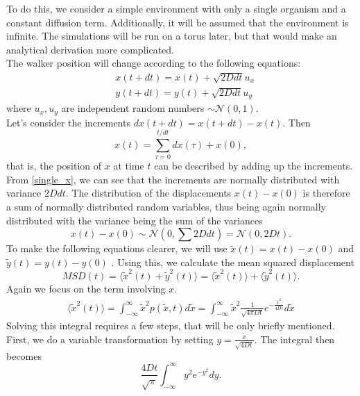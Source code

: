 \documentclass{article}
\begin{document}
To do this, we consider a simple environment with only a single organism and a constant diffusion term. 
Additionally, it will be assumed that the environment is infinite. 
The simulations will be run on a torus later, but that would make an analytical derivation more complicated.\\
The walker position will change according to the following equations:
\begin{align}
    & x(t + dt) = x(t) + \sqrt{2D dt} u_x \label{single_x}\\
    & y(t + dt) = y(t) + \sqrt{2D dt} u_y
\end{align}
where $u_x, u_y$ are independent random numbers $\sim \mathcal{N}(0,1)$.\\
Let's consider the increments $dx(t+dt) = x(t + dt) - x(t)$.
Then 
\begin{equation*}
    x(t) = \sum_{\tau = 0}^{t/dt} dx(\tau) + x(0),
\end{equation*}
that is, the position of $x$ at time $t$ can be described by adding up the increments.
From \ref{single_x}, we can see that the increments are normally distributed with variance $2D dt$.
The distribution of the displacements $x(t) - x(0)$ is therefore a sum of normally distributed random variables, thus being again normally distributed with the variance being the sum of the variances 
\begin{equation*}
    x(t) - x(0) \sim \mathcal{N}(0,\sum 2D dt) =  \mathcal{N}(0,2Dt).
\end{equation*}
To make the following equations clearer, we will use $\tilde{x}(t) = x(t)-x(0)$ and $\tilde{y}(t) = y(t)-y(0)$ .
Using this, we calculate the mean squared displacement 
\begin{equation*}
    MSD(t) = \langle \tilde{x}^2(t) +\tilde{y}^2(t) \rangle = \langle \tilde{x}^2(t)\rangle + \langle\tilde{y}^2(t) \rangle.
\end{equation*}
Again we focus on the term involving $x$.
\begin{align*}
    \langle \tilde{x}^2(t)\rangle = \int_{-\infty}^{\infty} \tilde{x}^2 p(\tilde{x},t)d\tilde{x} = \int_{-\infty}^{\infty} \tilde{x}^2 \frac{1}{\sqrt{4\pi Dt}} e^{-\frac{\tilde{x}^2}{4Dt}}d\tilde{x}
\end{align*}
Solving this integral requires a few steps, that will be only briefly mentioned. 
First, we do a variable transformation by setting $y = \frac{\tilde{x}}{\sqrt{4Dt}}$. 
The integral then becomes
\begin{equation*}
    \frac{4Dt}{\sqrt{\pi}}\int_{-\infty}^{\infty} y^2  e^{-y^2}dy.
\end{equation*}
\end{document}
